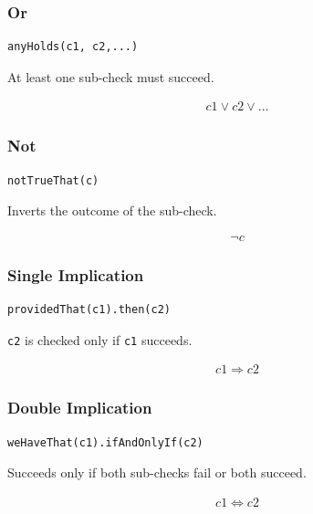 \documentclass[11pt,a4paper,notitlepage]{article}
\begin{document}
\subsubsection{Or}

\begin{lstlisting}
anyHolds(c1, c2,...)
\end{lstlisting}

At least one sub-check must succeed.

\begin{multline*}
c1 \lor c2 \lor ...
\end{multline*}

\subsubsection{Not}

\begin{lstlisting}
notTrueThat(c)
\end{lstlisting}

Inverts the outcome of the sub-check.

\begin{multline*}
\neg c
\end{multline*}

\subsubsection{Single Implication}

\begin{lstlisting}
providedThat(c1).then(c2)
\end{lstlisting}

\texttt{c2} is checked only if \texttt{c1} succeeds.

\begin{multline*}
c1 \Rightarrow c2
\end{multline*}

\subsubsection{Double Implication}

\begin{lstlisting}
weHaveThat(c1).ifAndOnlyIf(c2)
\end{lstlisting}

Succeeds only if both sub-checks fail or both succeed.

\begin{multline*}
c1 \iff c2
\end{multline*}
\end{document}
